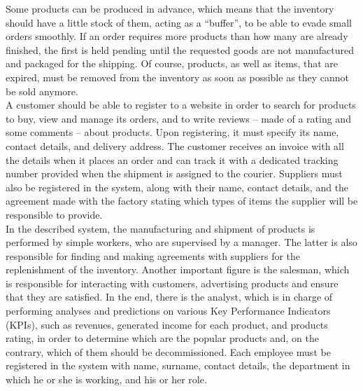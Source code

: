 Some products can be produced in advance, which means that the inventory should have a little stock of them, acting as a ``buffer'', to be able to evade small orders smoothly. If an order requires more products than how many are already finished, the first is held pending until the requested goods are not manufactured and packaged for the shipping. Of course, products, as well as items, that are expired, must be removed from the inventory as soon as possible as they cannot be sold anymore.\\

A customer should be able to register to a website in order to search for products to buy, view and manage its orders, and to write reviews -- made of a rating and some comments -- about products. Upon registering, it must specify its name, contact details, and delivery address. The customer receives an invoice with all the details when it places an order and can track it with a dedicated tracking number provided when the shipment is assigned to the courier. Suppliers must also be registered in the system, along with their name, contact details, and the agreement made with the factory stating which types of items the supplier will be responsible to provide.\\

In the described system, the manufacturing and shipment of products is performed by simple workers, who are supervised by a manager. The latter is also responsible for finding and making agreements with suppliers for the replenishment of the inventory. Another important figure is the salesman, which is responsible for interacting with customers, advertising products and ensure that they are satisfied. In the end, there is the analyst, which is in charge of performing analyses and predictions on various Key Performance Indicators (KPIs), such as revenues, generated income for each product, and products rating, in order to determine which are the popular products and, on the contrary, which of them should be decommissioned. Each employee must be registered in the system with name, surname, contact details, the department in which he or she is working, and his or her role.
